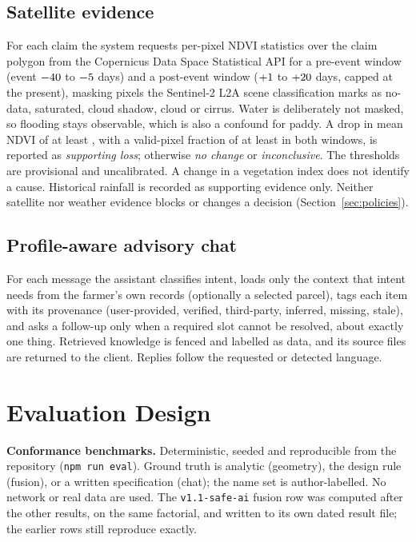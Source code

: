 \documentclass{ieeeaccess}
\begin{document}
\subsection{Satellite evidence}
For each claim the system requests per-pixel NDVI statistics over the claim polygon from the Copernicus Data Space Statistical API \cite{cdse_statistical} for a pre-event window (event $-40$ to $-5$ days) and a post-event window ($+1$ to $+20$ days, capped at the present), masking pixels the Sentinel-2 L2A scene classification marks as no-data, saturated, cloud shadow, cloud or cirrus. Water is deliberately not masked, so flooding stays observable, which is also a confound for paddy. A drop in mean NDVI of at least \SatNdviDropSupport{}, with a valid-pixel fraction of at least \SatMinValidPixelFraction{} in both windows, is reported as \emph{supporting loss}; otherwise \emph{no change} or \emph{inconclusive}. The thresholds are provisional and uncalibrated. A change in a vegetation index does not identify a cause. Historical rainfall \cite{openmeteo_hist} is recorded as supporting evidence only. Neither satellite nor weather evidence blocks or changes a decision (Section~\ref{sec:policies}).

\subsection{Profile-aware advisory chat}
For each message the assistant classifies intent, loads only the context that intent needs from the farmer's own records (optionally a selected parcel), tags each item with its provenance (user-provided, verified, third-party, inferred, missing, stale), and asks a follow-up only when a required slot cannot be resolved, about exactly one thing. Retrieved knowledge is fenced and labelled as data, and its source files are returned to the client. Replies follow the requested or detected language.

\section{Evaluation Design}
\textbf{Conformance benchmarks.} Deterministic, seeded and reproducible from the repository (\texttt{npm run eval}). Ground truth is analytic (geometry), the design rule (fusion), or a written specification (chat); the name set is author-labelled. No network or real data are used. The \texttt{v1.1-safe-ai} fusion row was computed after the other results, on the same factorial, and written to its own dated result file; the earlier rows still reproduce exactly.
\end{document}
